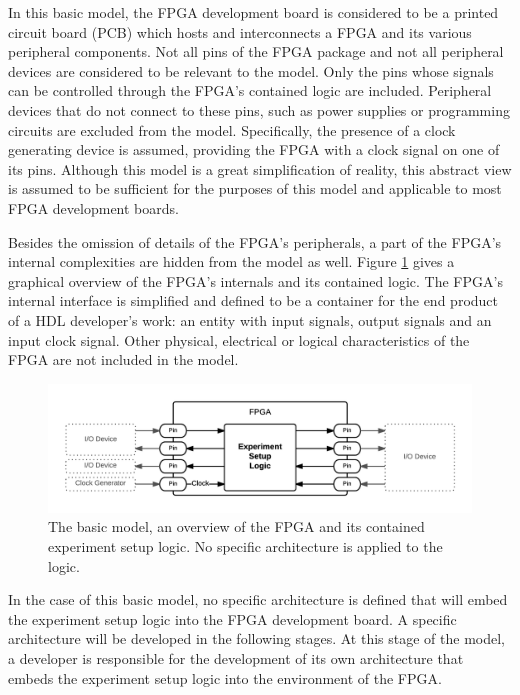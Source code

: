 \documentclass[openright]{template/uva-bachelor-thesis}
\begin{document}
In this basic model, the FPGA development board is considered to be a printed circuit board (PCB) which hosts and interconnects a FPGA and its various peripheral components. Not all pins of the FPGA package and not all peripheral devices are considered to be relevant to the model. Only the pins whose signals can be controlled through the FPGA's contained logic are included. Peripheral devices that do not connect to these pins, such as power supplies or programming circuits are excluded from the model. Specifically, the presence of a clock generating device is assumed, providing the FPGA with a clock signal on one of its pins. Although this model is a great simplification of reality, this abstract view is assumed to be sufficient for the purposes of this model and applicable to most FPGA development boards. 

Besides the omission of details of the FPGA's peripherals, a part of the FPGA's internal complexities are hidden from the model as well. Figure \ref{fig:fpga-basic} gives a graphical overview of the FPGA's internals and its contained logic. The FPGA's internal interface is simplified and defined to be a container for the end product of a HDL developer's work: an entity with input signals, output signals and an input clock signal. Other physical, electrical or logical characteristics of the FPGA are not included in the model.

\begin{figure}[h]
\centering
\includegraphics[width=\textwidth]{img/fpga-basic}
\caption{The basic model, an overview of the FPGA and its contained experiment setup logic. No specific architecture is applied to the logic.}
\label{fig:fpga-basic}
\end{figure}

In the case of this basic model, no specific architecture is defined that will embed the experiment setup logic into the FPGA development board. A specific architecture will be developed in the following stages. At this stage of the model, a developer is responsible for the development of its own architecture that embeds the experiment setup logic into the environment of the FPGA.
\end{document}
